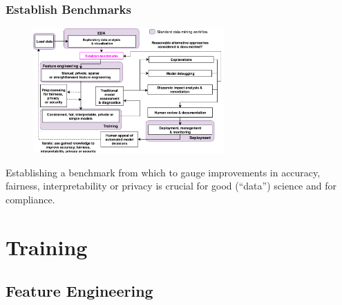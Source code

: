 \documentclass[11pt,
               aspectratio=169,
               hyperref={colorlinks}
               ]{beamer}
\begin{document}
		\begin{frame}
		
			\frametitle{Establish Benchmarks}		

			\begin{figure}[htb]
				\begin{center}
					\includegraphics[height=135pt]{img/bench.png}
					\label{fig:blueprint}
				\end{center}
			\end{figure}	

			\centering
			Establishing a benchmark from which to gauge improvements in accuracy, fairness, interpretability or privacy is crucial for good (``data'') science and for compliance. 
		
		\end{frame}


	\section{Training}

		\subsection{Feature Engineering}
\end{document}
